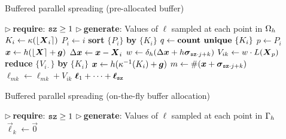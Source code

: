 \begin{algorithm}
\caption{Buffered parallel spreading (pre-allocated buffer)}
\label{algo:pa-spread}
\begin{algorithmic}[1]
\State $\triangleright\ $\textbf{require}: $\texttt{sz} \ge 1$
\State $\triangleright\ $\textbf{generate}: Values of $\ell$ sampled at each point in $\Omega_h$
 
    \State $K_i \gets \kappa(\left\lfloor{\boldsymbol{X}_i}\right\rceil)$ 
    \State $P_i \gets i$ 
\EndFor
\State \textbf{sort} $\{P_i\}$ \textbf{by} $\{K_i\}$
\State $q \gets \text{\textbf{count unique} }\{K_i\}$
 
     
        \State $p \gets P_i$
        \State $\boldsymbol{x} \gets h(\left\lfloor{\boldsymbol{X}}\right\rceil+\boldsymbol{g})$
        \State $\Delta\boldsymbol{x} \gets \boldsymbol{x}-\boldsymbol{X}_i$
            \State $w \gets \delta_h(\Delta\boldsymbol{x}+h\boldsymbol{\sigma}_{\texttt{sz}\cdot j + k})$
            \State $V_{ik} \gets w \cdot L(\boldsymbol{X}_p)$ 
        \EndFor
    \EndFor
    \State \textbf{reduce} $\{V_{i\cdot}\}$ \textbf{by} $\{K_i\}$
     
        \State $\boldsymbol{x} \gets h(\kappa^{-1}(K_i) + \boldsymbol{g})$
            \State $m \gets \#(\boldsymbol{x} + \boldsymbol{\sigma}_{\texttt{sz}\cdot j + k})$
                \State $\ell_{mk} \gets \ell_{mk} + V_{ik}$
            \EndIf
        \EndFor
    \EndFor
\EndFor
\State \Return $\boldsymbol{\ell}_1 + \cdots + \boldsymbol{\ell}_{\texttt{sz}}$
\EndProcedure
\end{algorithmic}
\end{algorithm}

\begin{algorithm}
\caption{Buffered parallel spreading (on-the-fly buffer allocation)}
\label{algo:otf-spread}
\begin{algorithmic}[1]
\State $\triangleright\ $\textbf{require}: $\texttt{sz} \ge 1$
\State $\triangleright\ $\textbf{generate}: Values of $\ell$ sampled at each point in $\Gamma_h$
    \State $\vec{\ell}_k \gets \vec{0}$
\EndFor
\State \Return {} 
\EndProcedure {}
\end{algorithmic}
\end{algorithm}

